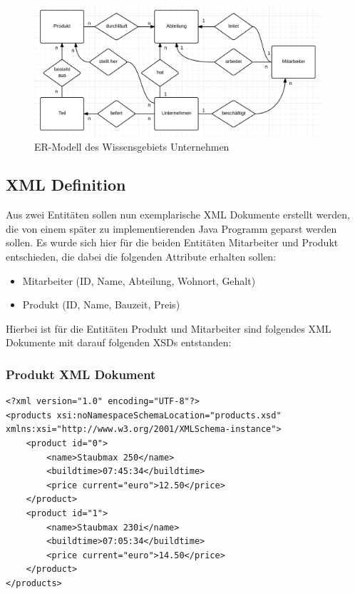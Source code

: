 \documentclass[DIV=calc,paper=a4,fontsize=9pt,twocolumn]{scrartcl}
\begin{document}
\begin{figure}[ht]
    \includegraphics[width=0.95\textwidth ]{er.png}{}
    \centering
    \caption{ER-Modell des Wissensgebiets Unternehmen}\label{fig:er}
\end{figure}

\subsection{XML Definition}

Aus zwei Entitäten sollen nun exemplarische XML Dokumente erstellt werden, die von einem später zu implementierenden Java Programm geparst werden sollen. Es wurde sich hier für die beiden Entitäten Mitarbeiter und Produkt entschieden, die dabei die folgenden Attribute erhalten sollen:

\begin{itemize}
\item Mitarbeiter (ID, Name, Abteilung, Wohnort, Gehalt) 
\item Produkt (ID, Name, Bauzeit, Preis) 
\end{itemize}

Hierbei ist für die Entitäten Produkt und Mitarbeiter sind folgendes XML Dokumente mit darauf folgenden XSDs entstanden:

\subsubsection{Produkt XML Dokument}

\lstset{language=XML}
\begin{lstlisting}
<?xml version="1.0" encoding="UTF-8"?>
<products xsi:noNamespaceSchemaLocation="products.xsd"
xmlns:xsi="http://www.w3.org/2001/XMLSchema-instance">
    <product id="0">
        <name>Staubmax 250</name>
        <buildtime>07:45:34</buildtime>
        <price current="euro">12.50</price>
    </product>
    <product id="1">
        <name>Staubmax 230i</name>
        <buildtime>07:05:34</buildtime>
        <price current="euro">14.50</price>
    </product>
</products>
\end{lstlisting}
\end{document}
